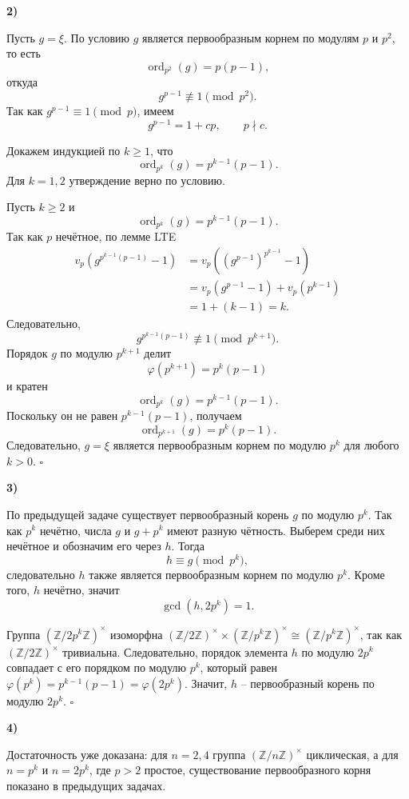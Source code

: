 \documentclass[12pt,a4paper]{article}
\newcommand{\soli}[1]{%
  \par\vspace{0.15\baselineskip}%
  \noindent\textbf{#1)}\ %
  \ignorespaces                     %
}
\begin{document}
\soli{2}

Пусть $g=\xi$. По условию $g$ является первообразным корнем по модулям $p$ и $p^2$, то есть
\[
\operatorname{ord}_{p^2}(g)=p(p-1),
\]
откуда
\[
g^{p-1}\not\equiv1\pmod{p^2}.
\]
Так как $g^{p-1}\equiv1\pmod p$, имеем
\[
g^{p-1}=1+cp,\qquad p\nmid c.
\]

Докажем индукцией по $k\ge1$, что
\[
\operatorname{ord}_{p^k}(g)=p^{k-1}(p-1).
\]
Для $k=1,2$ утверждение верно по условию.

Пусть $k\ge2$ и
\[
\operatorname{ord}_{p^k}(g)=p^{k-1}(p-1).
\]
Так как $p$ нечётное, по лемме LTE
\[
\begin{aligned}
v_p\left(g^{p^{k-1}(p-1)}-1\right)
&=v_p\left((g^{p-1})^{p^{k-1}}-1\right)\\
&=v_p(g^{p-1}-1)+v_p(p^{k-1})\\
&=1+(k-1)=k.
\end{aligned}
\]
Следовательно,
\[
g^{p^{k-1}(p-1)}
\not\equiv1\pmod{p^{k+1}}.
\]
Порядок $g$ по модулю $p^{k+1}$ делит
\[
\varphi(p^{k+1})=p^k(p-1)
\]
и кратен
\[
\operatorname{ord}_{p^k}(g)=p^{k-1}(p-1).
\]
Поскольку он не равен $p^{k-1}(p-1)$, получаем
\[
\operatorname{ord}_{p^{k+1}}(g)=p^k(p-1).
\]
Следовательно, $g=\xi$ является первообразным корнем по модулю $p^k$ для любого $k>0$. \hfill $\square$

\soli{3}

По предыдущей задаче существует первообразный корень $g$ по модулю $p^k$.
Так как $p^k$ нечётно, числа $g$ и $g + p^k$ имеют разную чётность. 
Выберем среди них нечётное и обозначим его через $h$. 
Тогда \[h \equiv g \pmod{p^k},\] 
следовательно $h$ также является первообразным корнем по модулю $p^k$. Кроме того, $h$ нечётно, значит 
\[\gcd(h, 2p^k) = 1.\]

Группа $(\mathbb{Z}/2p^k\mathbb{Z})^\times$ изоморфна $(\mathbb{Z}/2\mathbb{Z})^\times \times (\mathbb{Z}/p^k\mathbb{Z})^\times \cong (\mathbb{Z}/p^k\mathbb{Z})^\times$, так как $(\mathbb{Z}/2\mathbb{Z})^\times$ тривиальна. 
Следовательно, порядок элемента $h$ по модулю $2p^k$ совпадает с его порядком по модулю $p^k$, который равен $\varphi(p^k) = p^{k-1}(p-1) = \varphi(2p^k)$. 
Значит, $h$ -- первообразный корень по модулю $2p^k$. \hfill $\square$

\newpage

\soli{4}

Достаточность уже доказана: для $n=2,4$ группа $(\mathbb{Z}/n\mathbb{Z})^\times$ циклическая, а для $n=p^k$ и $n=2p^k$, где $p>2$ простое, существование первообразного корня показано в предыдущих задачах.
\end{document}
